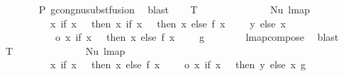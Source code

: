 \begin{isabellebody}
\ \ \ \ \ \ \isamarkupfalse%
\ P{}\ gcong{\isachardot}{\kern0pt}nu{\isacharunderscore}{\kern0pt}subst{\isacharunderscore}{\kern0pt}fusion{}\ \isamarkupfalse%
\ blast\isanewline
\ \ \isamarkupfalse%
\ T{}{\isacharcolon}{\kern0pt}\ {\isachardoublequoteopen}{\isachardot}{\kern0pt}{\isachardot}{\kern0pt}{\isachardot}{\kern0pt}\ {\isacharequal}{\kern0pt}\isanewline
\ \ \ \ \ \ \ \ \ \ \ \ Nu\ {\isacharparenleft}{\kern0pt}lmap\isanewline
\ \ \ \ \ \ \ \ \ \ {\isacharparenleft}{\kern0pt}{\isacharparenleft}{\kern0pt}{\isasymlambda}x{\isachardot}{\kern0pt}\ if\ x\ {\isacharequal}{\kern0pt}\ {}\ then\ {\isacharparenleft}{\kern0pt}{\isasymlambda}x{\isachardot}{\kern0pt}\ if\ x\ {\isacharequal}{\kern0pt}\ {}\ then\ x\ else\ f\ {\isacharparenleft}{\kern0pt}x\ {\isacharminus}{\kern0pt}\ {}{\isacharparenright}{\kern0pt}\ {\isacharplus}{\kern0pt}\ {}{\isacharparenright}{\kern0pt}\ y\ else\ x{\isacharparenright}{\kern0pt}\isanewline
\ \ \ \ \ \ \ \ \ \ \ o\ {\isacharparenleft}{\kern0pt}{\isasymlambda}x{\isachardot}{\kern0pt}\ if\ x\ {\isacharequal}{\kern0pt}\ {}\ then\ x\ else\ f\ {\isacharparenleft}{\kern0pt}x\ {\isacharminus}{\kern0pt}\ {}{\isacharparenright}{\kern0pt}\ {\isacharplus}{\kern0pt}\ {}{\isacharparenright}{\kern0pt}{\isacharparenright}{\kern0pt}\ g{\isacharparenright}{\kern0pt}{\isachardoublequoteclose}\isanewline
\ \ \ \ \ \ \isamarkupfalse%
\ lmap{\isacharunderscore}{\kern0pt}compose\ \isamarkupfalse%
\ blast\isanewline
\ \ \isamarkupfalse%
\ T{}{\isacharcolon}{\kern0pt}\ {\isachardoublequoteopen}{\isachardot}{\kern0pt}{\isachardot}{\kern0pt}{\isachardot}{\kern0pt}\ {\isacharequal}{\kern0pt}\isanewline
\ \ \ \ \ \ \ \ \ \ \ \ Nu\ {\isacharparenleft}{\kern0pt}lmap\isanewline
\ \ \ \ \ \ \ \ \ \ {\isacharparenleft}{\kern0pt}{\isacharparenleft}{\kern0pt}{\isasymlambda}x{\isachardot}{\kern0pt}\ if\ x\ {\isacharequal}{\kern0pt}\ {}\ then\ x\ else\ f\ {\isacharparenleft}{\kern0pt}x\ {\isacharminus}{\kern0pt}\ {}{\isacharparenright}{\kern0pt}\ {\isacharplus}{\kern0pt}\ {}{\isacharparenright}{\kern0pt}\ o\ {\isacharparenleft}{\kern0pt}{\isasymlambda}x{\isachardot}{\kern0pt}\ if\ x\ {\isacharequal}{\kern0pt}\ {}\ then\ y\ else\ x{\isacharparenright}{\kern0pt}{\isacharparenright}{\kern0pt}\ g{\isacharparenright}{\kern0pt}{\isachardoublequoteclose}\isanewline
\ \ \ \ \isamarkupfalse%

\end{isabellebody}
